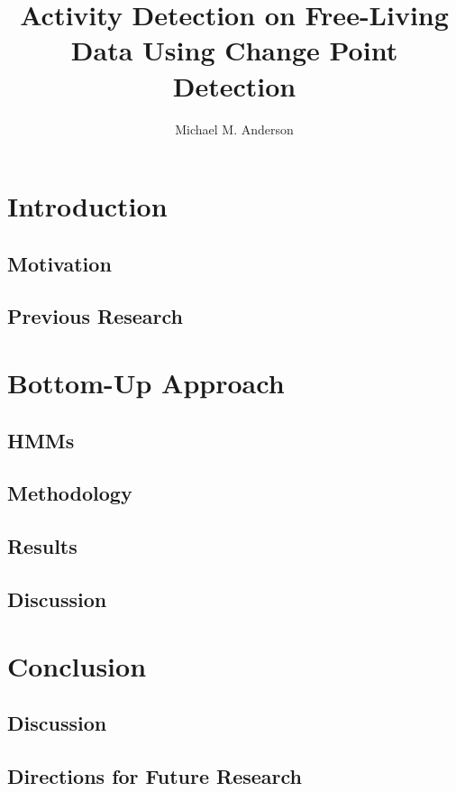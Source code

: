 \documentclass[onehalf,11pt]{beavtex}
\title{Activity Detection on Free-Living Data Using Change Point Detection}
\author{Michael M. Anderson}
\begin{document}
\maketitle
\mainmatter


\chapter{Introduction}
\section{Motivation}
\section{Previous Research}




\chapter{Bottom-Up Approach}
\section{HMMs}
\section{Methodology}
\section{Results}
\section{Discussion}

\chapter{Conclusion}
\section{Discussion}
\section{Directions for Future Research}




%
\end{document}
